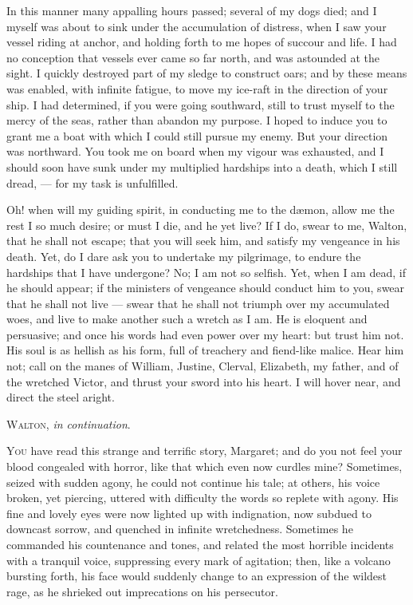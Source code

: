 In this manner many appalling hours
passed; several of my dogs died; and
I myself was about to sink under the
accumulation of distress, when I saw
your vessel riding at anchor, and holding
forth to me hopes of succour and
life. I had no conception that vessels
ever came so far north, and was
astounded at the sight. I quickly destroyed
part of my sledge to construct
oars; and by these means was enabled,
with infinite fatigue, to move my ice-raft
in the direction of your ship. I
had determined, if you were going
southward, still to trust myself to the
mercy of the seas, rather than abandon
my purpose. I hoped to induce you
to grant me a boat with which I could
still pursue my enemy. But your direction
was northward. You took me on
board when my vigour was exhausted,
and I should soon have sunk under my
multiplied hardships into a death, which
I still dread, --- for my task is unfulfilled.

Oh! when will my guiding spirit,
in conducting me to the dæmon, allow
me the rest I so much desire; or must
I die, and he yet live? If I do, swear
to me, Walton, that he shall not escape;
that you will seek him, and satisfy my
vengeance in his death. Yet, do I
dare ask you to undertake my pilgrimage,
to endure the hardships that I
have undergone? No; I am not so
selfish. Yet, when I am dead, if he
should appear; if the ministers of vengeance
should conduct him to you,
swear that he shall not live --- swear
that he shall not triumph over my
accumulated woes, and live to make
another such a wretch as I am. He is
eloquent and persuasive; and once
his words had even power over my
heart: but trust him not. His soul is
as hellish as his form, full of treachery
and fiend-like malice. Hear him not;
call on the manes of William, Justine,
Clerval, Elizabeth, my father, and of
the wretched Victor, and thrust your
sword into his heart. I will hover near,
and direct the steel aright.

\bigskip
\textsc{Walton}, \emph{in continuation}.


\noindent\textsc{You} have read this strange and terrific
story, Margaret; and do you not
feel your blood congealed with horror,
like that which even now curdles mine?
Sometimes, seized with sudden agony,
he could not continue his tale; at
others, his voice broken, yet piercing,
uttered with difficulty the words so
replete with agony. His fine and lovely
eyes were now lighted up with indignation,
now subdued to downcast sorrow,
and quenched in infinite wretchedness.
Sometimes he commanded his
countenance and tones, and related the
most horrible incidents with a tranquil
voice, suppressing every mark of agitation;
then, like a volcano bursting
forth, his face would suddenly change
to an expression of the wildest rage,
as he shrieked out imprecations on his
persecutor.

